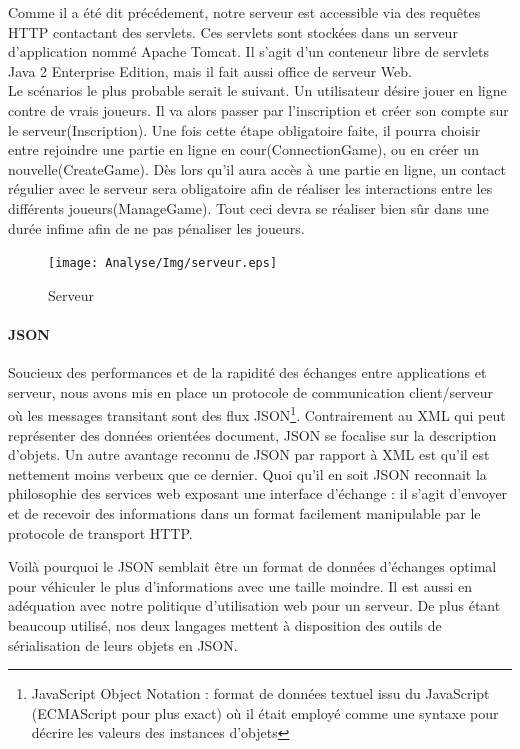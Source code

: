		
		Comme il a été dit précédement, notre serveur est accessible via des requêtes
		HTTP contactant des servlets. Ces servlets sont stockées dans un serveur
		d'application nommé Apache Tomcat. Il s'agit d'un conteneur libre de
		servlets Java 2 Enterprise Edition, mais il fait aussi office de serveur
		Web.\\
		
		
		Le scénarios le plus probable serait le suivant. Un utilisateur désire jouer
		en ligne contre de vrais joueurs. 
		Il va alors passer par l'inscription et créer son compte sur le
		serveur(Inscription). Une fois cette étape obligatoire faite, il pourra
		choisir entre rejoindre une partie en ligne en cour(ConnectionGame), ou en
		créer un nouvelle(CreateGame). Dès lors qu'il aura accès à une partie en
		ligne, un contact régulier avec le serveur sera obligatoire afin de réaliser
		les interactions entre les différents joueurs(ManageGame). Tout ceci devra se
		réaliser bien sûr dans une durée infime afin de ne pas pénaliser les joueurs.	
		
		\begin{figure}
			\texttt{[image: Analyse/Img/serveur.eps]}
			 \caption {Serveur}
		\end{figure}
		
		\newpage
		
		
	\paragraph{JSON\\}	
		Soucieux des performances et de la rapidité des échanges entre applications et
		serveur, nous avons mis en place un protocole de communication client/serveur
		où les messages transitant sont des flux JSON\footnote{JavaScript Object
		Notation :  format de données textuel issu du JavaScript (ECMAScript pour plus
		exact) où il était employé comme une syntaxe pour décrire les valeurs des
		instances d’objets}. 	
		Contrairement au XML qui peut représenter des données orientées document,
		JSON se focalise sur la description d’objets.
		Un autre avantage reconnu de JSON par rapport à XML est qu’il est nettement
		moins verbeux que ce dernier.
		Quoi qu’il en soit JSON reconnait la philosophie des services web exposant
		une interface d’échange : il s’agit
		d’envoyer et de recevoir des informations dans un format facilement manipulable par
		le protocole de transport HTTP.
		
		
		Voilà pourquoi le JSON semblait être un format de données d'échanges optimal
		pour véhiculer le plus d'informations avec une taille moindre. Il est aussi en
		adéquation avec notre politique d'utilisation web pour un serveur.
		De plus étant beaucoup utilisé, nos deux
		langages mettent à disposition des outils de sérialisation de leurs objets en JSON.
		
